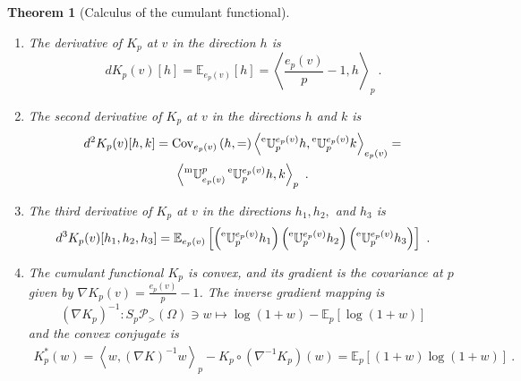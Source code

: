 \documentclass[axioms,article,submit,pdftex,moreauthors]{Definitions/mdpi}
\theoremstyle{plain}
\newtheorem{theo}{Theorem}
\theoremstyle{remark}
\newcommand{\Cov}{\operatorname{Cov}}
\newcommand{\Expectation}{\mathbb E}
\newcommand{\covat}[3]{\Cov_{#1}\left(#2,#3\right)}
\newcommand{\etransport}[2]{\prescript{\text{e}}{} {\mathbb U} _ {#1} ^ {#2}}
\newcommand{\expectat}[2]{\Expectation_{#1}\left[#2\right]}
\newcommand{\expfibreat}[2]{S_{#1}\pdensitieson{#2}}
\newcommand{\mtransport}[2]{\prescript{\text{m}}{} {\mathbb U} _ {#1} ^ {#2}}
\newcommand{\pdensitieson}[1]{\mathcal P_{>}\left(#1\right)}
\newcommand{\scalarat}[3]{\left\langle#2,#3\right\rangle_{#1}}
\begin{document}
\begin{theo}[Calculus of the cumulant functional] \label{th:K-calculus}
\begin{enumerate}\ 
\item \label{item:K-calculus-1} The derivative of \( K_p \) at \( v \) in the direction \( h \) is
\begin{equation} 
dK_p(v)[h] = \expectat{e_p(v)} h = \scalarat p {\frac{e_p(v)}{p} - 1} h \ .
\end{equation} 

\item \label{item:K-calculus-2} The second derivative of \( K_p \) at \( v \) in the directions \( h \) and \( k \) is
\begin{multline} 
d^2K_p(v)[h, k] = \covat {e_p(v)} h = \scalarat {e_p(v)} {\etransport p {e_p(v)} h}{\etransport p {e_p(v)} k} = \\ \scalarat p {\mtransport {e_p(v)} p \etransport p {e_p(v)} h}{k} \ .
\end{multline} 

\item \label{item:K-calculus-3} The third derivative of \( K_p \) at \( v \) in the directions \( h_1, h_2, \) and \( h_3 \) is
\begin{equation*} 
d^3K_p(v)[h_1, h_2, h_3] = \expectat {e_p(v)} {\left(\etransport p {e_p(v)} h_1\right) \left(\etransport p {e_p(v)} h_2 \right) \left(\etransport p {e_p(v)} h_3\right)} \ .
\end{equation*}
\item \label{item:K-calculus-4} 
The cumulant functional $K_p$ is convex, and its gradient is the covariance at $p$ given by $\nabla K_p(v) = \frac {e_p(v)} p - 1$. The inverse gradient mapping is \begin{equation*}
(\nabla K_p)^{-1} \colon \expfibreat p \Omega \ni w \mapsto \log(1+w) - \expectat p {\log(1+w)} 
\end{equation*} and the convex conjugate is
\begin{multline}
    K_p^* (w) = \scalarat p {w}{(\nabla K)^{-1} w} - K_p \circ (\nabla^{-1} K_p)(w) = \expectat p {(1+w) \log (1+w)} \ .
\end{multline}\end{enumerate}    
\end{theo}  
\end{document}

